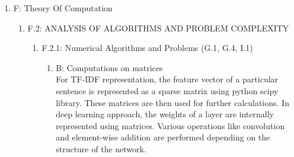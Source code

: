 \documentclass[oneside,a4paper,12pt]{book}
\begin{document}
\begin{enumerate}
	\item[] F: Theory Of Computation 
	\begin{enumerate}
		\item[] F.2: ANALYSIS OF ALGORITHMS AND PROBLEM COMPLEXITY 
		\begin{enumerate}
			\item[] F.2.1: Numerical Algorithms and Problems (G.1, G.4, I.1) 
			\begin{enumerate}
				\item[]  B: Computations on matrices \\
						For TF-IDF representation, the feature vector of a particular sentence is represented as a sparse matrix using python scipy library. These matrices are then used for further calculations. In deep learning approach, the weights of a layer are internally represented using matrices. Various operations like convolution and element-wise addition are performed depending on the structure of the network.
			\end{enumerate}
		\end{enumerate}
		

\end{enumerate}
\end{enumerate}
\end{document}
